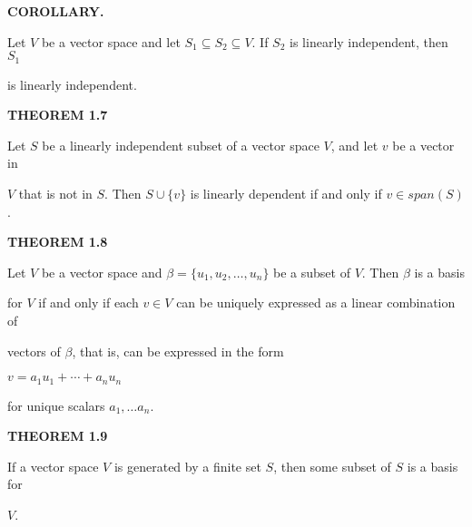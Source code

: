 \documentclass[12pt, a4paper]{article}
\begin{document}
 \vspace{4mm}
 
 \noindent\blacktriangle\textbf{ COROLLARY.}
 
 \vspace{2mm}
 
  Let $V$ be a vector space and let $S_1\subseteq S_2\subseteq V$. If $S_2$ is linearly independent, then $S_1$\par is linearly independent.
  
  \newpage
  
  \noindent\blacksquare\textbf{ THEOREM 1.7}
  
  \vspace{2mm}
  
  Let $S$ be a linearly independent subset of a vector space $V$, and let $v$ be a vector in\par $V$ that is not in $S$. Then $S\cup\{v\}$ is linearly dependent if and only if $v\in span(S)$.
  
  \vspace{4mm}
  
  \noindent\blacksquare\textbf{ THEOREM 1.8}
  
  \vspace{2mm}
  
  Let $V$ be a vector space and $\beta=\{u_1,u_2,\dots, u_n\}$ be a subset of $V$. Then $\beta$ is a basis\par for $V$ if and only if each $v\in V$ can be uniquely expressed as a linear combination of\par vectors of $\beta$, that is, can be expressed in the form
  
  \vspace{2mm}
  
  \centerline{$v=a_1u_1+\cdots +a_nu_n$}
  
  \vspace{2mm}
  
  \par for unique scalars $a_1,\dots a_n$.
  
  \vspace{4mm}
  
  \noindent\blacksquare\textbf{ THEOREM 1.9}
  
  \vspace{2mm}
  
  If a vector space $V$ is generated by a finite set $S$, then some subset of $S$ is a basis for\par $V$.
  
  \vspace{4mm}
  
\end{document}
